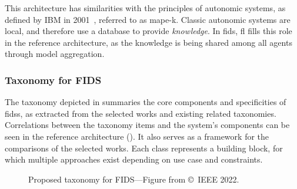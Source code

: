 This architecture has similarities with the principles of autonomic systems, as defined by IBM in 2001~\cite{kephart_visionautonomiccomputing_2003}, referred to as \gls{mape-k}.
Classic autonomic systems are local, and therefore use a database to provide \emph{knowledge}.
In \gls{fids}, \gls{fl} fills this role in the reference architecture, as the knowledge is being shared among all agents through model aggregation.


\subsubsection{Taxonomy for FIDS\label{sec:sota.discuss.synthesis.taxo}}

The taxonomy depicted in  summaries the core components and specificities of \glspl{fids}, as extracted from the selected works and existing related taxonomies.
Correlations between the taxonomy items and the system's components can be seen in the reference architecture ().
It also serves as a framework for the comparisons of the selected works.
Each class represents a building block, for which multiple approaches exist depending on use case and constraints.

\begin{figure}
  \centering
  \resizebox{\textwidth}{!}{}
  \caption{
    Proposed taxonomy for FIDS---Figure from \textcite{lavaur_EvolutionFederatedLearningbased_2022} \copyright~IEEE 2022.
    \label{fig:sota.taxonomy}
  }
\end{figure}


